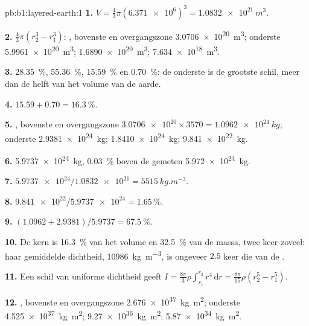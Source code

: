 \begin{solution}{pb:b1:layered-earth:1}
\textbf{1.} $V = \tfrac43\pi(\num{6.371e6})^3 = \qty{1.0832e21}{m^3}$.

\textbf{2.} $\tfrac43\pi(r_2^3 - r_1^3)$: , bovenste  en overgangszone
\qty{3.0706e20}{m^3}; onderste  \qty{5.9961e20}{m^3}; 
\qty{1.6890e20}{m^3};  \qty{7.634e18}{m^3}.

\textbf{3.} \qty{28.35}{\percent}, \qty{55.36}{\percent}, \qty{15.59}{\percent}
en \qty{0.70}{\percent}: de onderste  is de grootste schil, meer dan de helft
van het volume van de aarde.

\textbf{4.} $15.59 + 0.70 = \qty{16.3}{\percent}$.

\textbf{5.} , bovenste  en overgangszone $\num{3.0706e20}\times3570 =
\qty{1.0962e24}{kg}$; onderste  \qty{2.9381e24}{kg}; 
\qty{1.8410e24}{kg};  \qty{9.841e22}{kg}.

\textbf{6.} \qty{5.9737e24}{kg}, \qty{0.03}{\percent} boven de gemeten
\qty{5.972e24}{kg}.

\textbf{7.} $\num{5.9737e24}/\num{1.0832e21} = \qty{5515}{kg.m^{-3}}$.

\textbf{8.} $\num{9.841e22}/\num{5.9737e24} = \qty{1.65}{\percent}$.

\textbf{9.} $(1.0962 + 2.9381)/5.9737 = \qty{67.5}{\percent}$.

\textbf{10.} De kern is \qty{16.3}{\percent} van het volume en
\qty{32.5}{\percent} van de massa, twee keer zoveel: haar gemiddelde dichtheid,
\qty{10986}{kg.m^{-3}}, is ongeveer $2.5$ keer die van de .

\textbf{11.} Een schil van uniforme dichtheid geeft
$I = \tfrac{8\pi}{3}\rho\int_{r_1}^{r_2} r^4\,\mathrm dr = \tfrac{8\pi}{15}\rho
(r_2^5 - r_1^5)$.

\textbf{12.} , bovenste  en overgangszone \qty{2.676e37}{kg.m^2}; onderste 
\qty{4.525e37}{kg.m^2};  \qty{9.27e36}{kg.m^2}; 
\qty{5.87e34}{kg.m^2}.


\end{solution}
